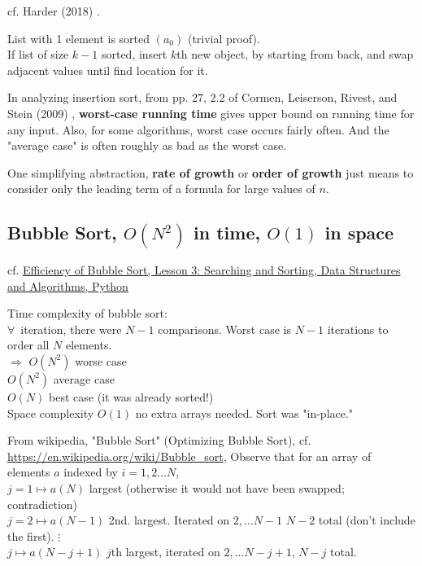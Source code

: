 \documentclass[10pt]{amsart}
\begin{document}
cf. Harder (2018) \cite{Hard2018}.

List with 1 element is sorted $(a_0)$ (trivial proof). \\

If list of size $k-1$ sorted, insert $k$th new object, by starting from back, and swap adjacent values until find location for it.

In analyzing insertion sort, from pp. 27, 2.2 of Cormen, Leiserson, Rivest, and Stein (2009) \cite{CLRS2009}, \textbf{worst-case running time} gives upper bound on running time for any input. Also, for some algorithms, worst case occurs fairly often. And the "average case" is often roughly as bad as the worst case.

One simplifying abstraction, \textbf{rate of growth} or \textbf{order of growth} just means to consider only the leading term of a formula for large values of $n$.



\subsection{Bubble Sort, $O(N^2)$ in time, $O(1)$ in space}

cf. \href{https://classroom.udacity.com/courses/ud513/lessons/7123524086/concepts/71191848070923}{Efficiency of Bubble Sort, Lesson 3: Searching and Sorting, Data Structures and Algorithms, Python}

Time complexity of bubble sort: \\
$\forall \, $ iteration, there were $N-1$ comparisons. Worst case is $N - 1$ iterations to order all $N$ elements. \\
$\Longrightarrow $ $O(N^2)$ worse case \\
\phantom{$\Longrightarrow$} $O(N^2)$ average case \\
\phantom{$\Longrightarrow$} $O(N)$ best case (it was already sorted!) \\

Space complexity $O(1)$ no extra arrays needed. Sort was "in-place."

From wikipedia, "Bubble Sort" (Optimizing Bubble Sort), cf. \url{https://en.wikipedia.org/wiki/Bubble_sort}, Observe that for an array of elements $a$ indexed by $i = 1, 2 \dots N$,  \\
$j = 1 \mapsto a(N) $ largest (otherwise it would not have been swapped; contradiction) \\
$j = 2 \mapsto a(N-1)$ 2nd. largest. Iterated on $ 2, \dots N-1$ $N-2$ total (don't include the first).
$ \vdots$ \\
$ j \mapsto a(N-j +1)$ $j$th largest, iterated on $2, \dots N- j +1$, $N-j$ total.
\end{document}
